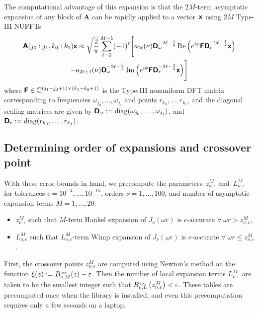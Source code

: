 The computational advantage of this expansion is that the $2M$-term asymptotic
expansion of any block of $\bm{A}$ can be rapidly applied to a vector~$\bm{\mathsf{x}}$
using $2M$ Type-III NUFFTs
\begin{multline}
    \bm{\mathsf{A}}(j_0:j_1, k_0:k_1) \bm{\mathsf{x}} 
    \approx \sqrt{\frac{2}{\pi}} \sum_{\ell=0}^{M-1} (-1)^\ell \Bigg[ 
        a_{2\ell}(\nu) \bm{\mathsf{D}}_\omega^{-2\ell-\frac{1}{2}} \operatorname*{Re}\Big(e^{i\phi}
                                                             \bm{\mathsf{F}}
                                                             \bm{\mathsf{D}}_r^{-2\ell-\frac{1}{2}}
                                                             \bm{\mathsf{x}} \Big) \\
        - a_{2\ell+1}(\nu) \bm{\mathsf{D}}_\omega^{-2\ell-\frac{3}{2}}
                                                             \operatorname*{Im}\Big(e^{i\phi}
                                                               \bm{\mathsf{F}}
                                                               \bm{\mathsf{D}}_r^{-2\ell-\frac{3}{2}}
                                                               \bm{\mathsf{x}} \Big) 
    \Bigg]
\end{multline}
where $\bm{\mathsf{F}} \in \mathbb{C}^{(j_1 - j_0 + 1) \times (k_1 - k_0 + 1)}$ is the Type-III
nonuniform DFT matrix corresponding to frequencies $\omega_{j_0}, \dots,
\omega_{j_1}$ and points $r_{k_0}, \dots, r_{k_1}$, and the diagonal scaling
matrices are given by $\bm{\mathsf{D}}_\omega :=
\operatorname{diag}(\omega_{j_0},\dots,\omega_{j_1})$, and $\bm{\mathsf{D}}_r :=
\operatorname{diag}(r_{k_0},\dots,r_{k_1})$.

\subsection{Determining order of expansions and crossover point}
\label{sec:cutoff}

With these error bounds in hand, we precompute the parameters~$z_{\nu,
\epsilon}^M$ and~$L_{\nu, \epsilon}^M$ for tolerances $\epsilon = 10^{-4},
\dots, \allowbreak 10^{-15}$, orders $\nu = 1, \dots, 100$, and number of
asymptotic expansion terms $M = 1, \dots, 20$:
\begin{itemize}
    \item $z_{\nu, \epsilon}^M$ such that $M$-term Hankel expansion of
    $J_\nu(\omega r)$ is $\epsilon$-accurate $\forall \ \omega r > z_{\nu,
    \epsilon}^M$,
    \item $L_{\nu, \epsilon}^M$ such that $L_{\nu, \epsilon}^M$-term Wimp
    expansion of $J_\nu(\omega r)$ is $\epsilon$-accurate $\forall \ \omega r
    \leq z_{\nu, \epsilon}^M$.
\end{itemize}
First, the crossover points $z_{\nu, \epsilon}^M$ are computed using Newton's
method on the function $\xi(z) := \Basy(z) - \epsilon$. Then the number of local
expansion terms $L_{\nu, \epsilon}^M$ are taken to be the smallest integer such
that $\Bloc\left(z_{\nu, \epsilon}^M\right) < \epsilon$. These tables are
precomputed once when the library is installed, and even this precomputation
requires only a few seconds on a laptop.

